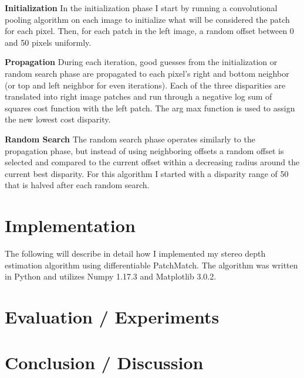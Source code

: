 \documentclass{article}
\begin{document}
\textbf{Initialization} In the initialization phase I start by running a convolutional pooling algorithm on each image to initialize what will be considered the patch for each pixel. Then, for each patch in the left image, a random offset between 0 and 50 pixels uniformly.

\textbf{Propagation} During each iteration, good guesses from the initialization or random search phase are propagated to each pixel’s right and bottom neighbor (or top and left neighbor for even iterations). Each of the three disparities are translated into right image patches and run through a negative log sum of squares cost function with the left patch. The arg max function is used to assign the new lowest cost disparity.

\textbf{Random Search} The random search phase operates similarly to the propagation phase, but instead of using neighboring offsets a random offset is selected and compared to the current offset within a decreasing radius around the current best disparity. For this algorithm I started with a disparity range of 50 that is halved after each random search.

\section{Implementation}
The following will describe in detail how I implemented my stereo depth estimation algorithm using differentiable PatchMatch. The algorithm was written in Python and utilizes Numpy 1.17.3 and Matplotlib 3.0.2.

\section{Evaluation / Experiments}

\section{Conclusion / Discussion}



\end{document}

